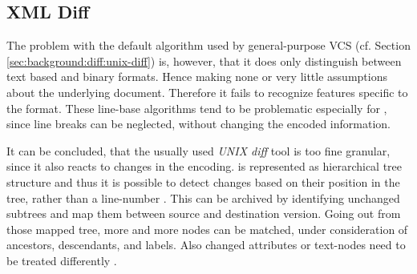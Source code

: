 	\subsection{XML Diff}
	\label{sec:background:diff:xml-diff}
	The problem with the default algorithm used by general-purpose VCS (cf. Section \ref{sec:background:diff:unix-diff}) is, however, that it does only distinguish between text based and binary formats. Hence making none or very little assumptions about the underlying document. Therefore it fails to recognize features specific to the format. These line-base algorithms tend to be problematic especially for \xml, since line breaks can be neglected, without changing the encoded information. \citep{Ronnau2005}
	
	It can be concluded, that the usually used \emph{UNIX diff} tool is too fine granular, since it also reacts to changes in the encoding. \xml is represented as hierarchical tree structure and thus it is possible to detect changes based on their position in the tree, rather than a line-number \citep{Wang2003,Chawathe1996,Cobena2002}.
	This can be archived by identifying unchanged subtrees and map them between source and destination version. Going out from those mapped tree, more and more nodes can be matched, under consideration of ancestors, descendants, and labels. Also changed attributes or text-nodes need to be treated differently \citep{Cobena2002}.
	
